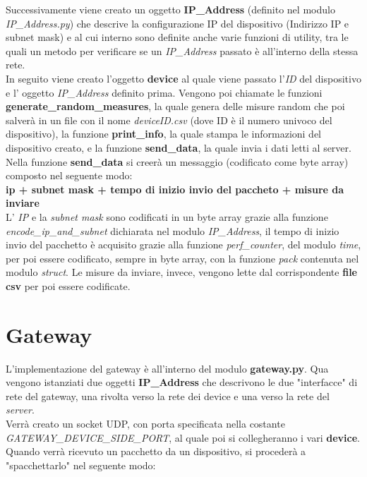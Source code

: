 \documentclass[a4paper, 14pt]{extreport}
\begin{document}
    Successivamente viene creato un oggetto \textbf{IP\_Address} (definito nel modulo \emph{IP\_Address.py}) 
    che descrive la configurazione IP del dispositivo (Indirizzo IP e subnet mask) e al cui interno sono definite anche
    varie funzioni di utility, tra le quali un metodo per verificare se un \emph{IP\_Address} passato è all'interno della stessa rete. \\
    In seguito viene creato l'oggetto \textbf{device} al quale viene passato l'\emph{ID} del dispositivo
    e l' oggetto \emph{IP\_Address} definito prima.
    Vengono poi chiamate le funzioni \textbf{generate\_random\_measures}, la quale genera delle misure random che poi salverà in un 
    file con il nome \emph{deviceID.csv} (dove ID è il numero univoco del dispositivo),
    la funzione \textbf{print\_info}, la quale stampa le informazioni del dispositivo creato, e la funzione \textbf{send\_data}, la
    quale invia i dati letti al server.
    Nella funzione \textbf{send\_data} si creerà un messaggio (codificato come byte array) composto nel seguente modo: \\
    \textbf{ip + subnet mask + tempo di inizio invio del paccheto + misure da inviare}        \\
    L' \emph{IP} e la \emph{subnet mask} sono codificati in un byte array grazie alla funzione \emph{encode\_ip\_and\_subnet}
    dichiarata nel modulo \emph{IP\_Address}, il tempo di inizio invio del pacchetto è acquisito grazie alla funzione \emph{perf\_counter},
    del modulo \emph{time}, per poi essere codificato, sempre in byte array, con la funzione \emph{pack} contenuta nel modulo 
    \emph{struct}. Le misure da inviare, invece, vengono lette dal corrispondente \textbf{file csv} per poi essere codificate.

    \pagebreak

    \section{Gateway}
    L'implementazione del gateway è all'interno del modulo \textbf{gateway.py}.
    Qua vengono istanziati due oggetti \textbf{IP\_Address} che descrivono le due "interfacce" di rete
    del gateway, una rivolta verso la rete dei device e una verso la rete del \emph{server}. \\
    Verrà creato un socket UDP, con porta specificata nella costante \\
    \emph{GATEWAY\_DEVICE\_SIDE\_PORT}, al quale poi si collegheranno i vari \textbf{device}.
    Quando verrà ricevuto un pacchetto da un dispositivo, si procederà a "spacchettarlo" nel seguente modo:
\end{document}
